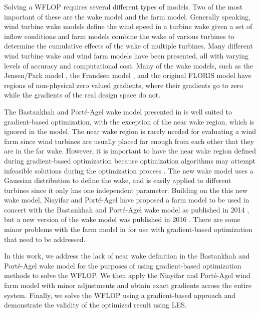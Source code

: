 \documentclass[conf]{new-aiaa}
\begin{document}
Solving a WFLOP requires several different types of models. Two of the most important of these are the wake model and the farm model. Generally speaking, wind turbine wake models define the wind speed in a turbine wake given a set of inflow conditions and farm models combine the wake of various turbines to determine the cumulative effects of the wake of multiple turbines. Many different wind turbine wake and wind farm models have been presented, all with varying levels of accuracy and computational cost. Many of the wake models, such as the Jensen/Park model \cite{jensen1983}, the Frandsen model \cite{frandsen2006}, and the original FLORIS model \cite{gebraad2014} have regions of non-physical zero valued gradients, where their gradients go to zero while the gradients of the real design space do not. 

The Bastankhah and Port\'{e}-Agel wake model presented in \cite{bastankhah2014, bastankhah2016} is well suited to gradient-based optimization, with the exception of the near wake region, which is ignored in the model. The near wake region is rarely needed for evaluating a wind farm since wind turbines are usually placed far enough from each other that they are in the far wake. However, it is important to have the near wake region defined during gradient-based optimization because optimization algorithms may attempt infeasible solutions during the optimization process \cite{belegundu2011}. The new wake model uses a Gaussian distribution to define the wake, and is easily applied to different turbines since it only has one independent parameter. Building on the this new wake model, Niayifar and Port\'{e}-Agel have proposed a farm model \cite{niayifar2015, niayifar2016} to be used in concert with the Bastankhah and Port\'{e}-Agel wake model as published in 2014 \cite{bastankhah2014}, but a new version of the wake model was published in 2016 \cite{bastankhah2016}. There are some minor problems with the farm model in \cite{niayifar2016} for use with gradient-based optimization that need to be addressed.

In this work, we address the lack of near wake definition in the Bastankhah and Port\'{e}-Agel wake model for the purposes of using gradient-based optimization methods to solve the WFLOP. We then apply the Niayifar and Port\'{e}-Agel wind farm model with minor adjustments and obtain exact gradients across the entire system. Finally, we solve the WFLOP using a gradient-based approach and demonstrate the validity of the optimized result using LES.
\end{document}
